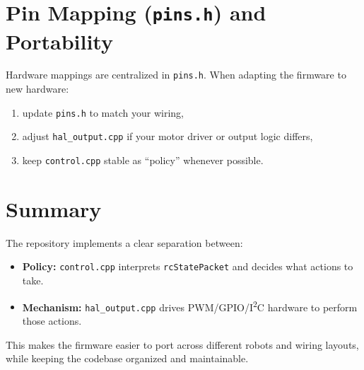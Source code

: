 \section{Pin Mapping (\texttt{pins.h}) and Portability}
\label{sec:control-hal-pins}

Hardware mappings are centralized in \texttt{pins.h}. When adapting the firmware to new hardware:

\begin{enumerate}
    \item update \texttt{pins.h} to match your wiring,
    \item adjust \texttt{hal\_output.cpp} if your motor driver or output logic differs,
    \item keep \texttt{control.cpp} stable as ``policy'' whenever possible.
\end{enumerate}

\section{Summary}
\label{sec:control-hal-summary}

The repository implements a clear separation between:

\begin{itemize}
    \item \textbf{Policy:} \texttt{control.cpp} interprets \texttt{rcStatePacket} and decides what actions to take.
    \item \textbf{Mechanism:} \texttt{hal\_output.cpp} drives PWM/GPIO/I\textsuperscript{2}C hardware to perform those actions.
\end{itemize}

This makes the firmware easier to port across different robots and wiring layouts, while keeping the codebase
organized and maintainable.
